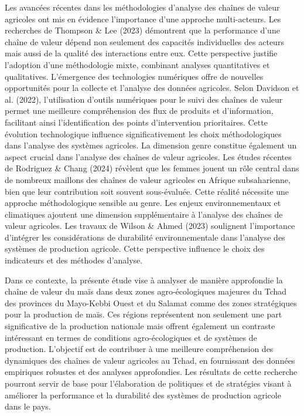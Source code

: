 \documentclass[12pt,oneside]{report}
\begin{document}
Les avancées récentes dans les méthodologies d'analyse des chaînes de valeur agricoles ont mis en évidence l'importance d'une approche multi-acteurs. Les recherches de Thompson \& Lee (2023) démontrent que la performance d'une chaîne de valeur dépend non seulement des capacités individuelles des acteurs mais aussi de la qualité des interactions entre eux. Cette perspective justifie l'adoption d'une méthodologie mixte, combinant analyses quantitatives et qualitatives. L'émergence des technologies numériques offre de nouvelles opportunités pour la collecte et l'analyse des données agricoles. Selon Davidson et al. (2022), l'utilisation d'outils numériques pour le suivi des chaînes de valeur permet une meilleure compréhension des flux de produits et d'information, facilitant ainsi l'identification des points d'intervention prioritaires. Cette évolution technologique influence significativement les choix méthodologiques dans l'analyse des systèmes agricoles. La dimension genre constitue également un aspect crucial dans l'analyse des chaînes de valeur agricoles. Les études récentes de Rodriguez \& Chang (2024) révèlent que les femmes jouent un rôle central dans de nombreux maillons des chaînes de valeur agricoles en Afrique subsaharienne, bien que leur contribution soit souvent sous-évaluée. Cette réalité nécessite une approche méthodologique sensible au genre. Les enjeux environnementaux et climatiques ajoutent une dimension supplémentaire à l'analyse des chaînes de valeur agricoles. Les travaux de Wilson \& Ahmed (2023) soulignent l'importance d'intégrer les considérations de durabilité environnementale dans l'analyse des systèmes de production agricole. Cette perspective influence le choix des indicateurs et des méthodes d'analyse.

Dans ce contexte, la présente étude vise à analyser de manière approfondie la chaîne de valeur du maïs dans deux zones agro-écologiques majeures du Tchad des provinces du Mayo-Kebbi Ouest et du Salamat comme des zones stratégiques pour la production de maïs. Ces régions représentent non seulement une part significative de la production nationale mais offrent également un contraste intéressant en termes de conditions agro-écologiques et de systèmes de production. L’objectif est de contribuer à une meilleure compréhension des dynamiques des chaînes de valeur agricoles au Tchad, en fournissant des données empiriques robustes et des analyses approfondies. Les résultats de cette recherche pourront servir de base pour l'élaboration de politiques et de stratégies visant à améliorer la performance et la durabilité des systèmes de production agricole dans le pays.
\end{document}
